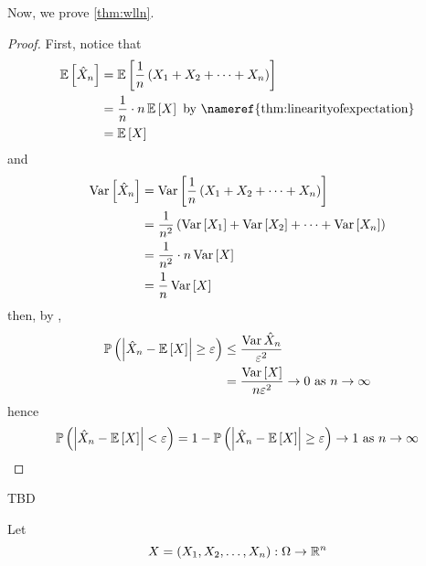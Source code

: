 Now, we prove \cref{thm:wlln}.

\begin{proof}
    First, notice that
    \begin{align*}\expectation{\sampleavg{X}_n}
         & = \expectation{\frac{1}{n}\left(X_1 + X_2 + \dots + X_n\right)}                     \\
         & = \frac{1}{n} \cdot n\expectation{X}\hbox{ by \nameref{thm:linearityofexpectation}} \\
         & = \expectation{X}
    \end{align*}
    and
    \begin{align*}\operatorname{\operatorname{Var}}\left[\hat{X}_n\right]
         & = \operatorname{\operatorname{Var}}\left[\frac{1}{n}\left(X_1 + X_2 + \dots + X_n\right)\right]                         \\
         & = \frac{1}{n^2}\left(\operatorname{\operatorname{Var}}\left[X_1\right] + \operatorname{\operatorname{Var}}\left[X_2\right] + \dots + \operatorname{\operatorname{Var}}\left[X_n\right]\right) \\
         & = \frac{1}{n^2} \cdot n \operatorname{\operatorname{Var}}\left[X\right]                                                 \\
         & = \frac{1}{n}\operatorname{\operatorname{Var}}\left[X\right]
    \end{align*}
    then, by ,
    \begin{align*}\prob{\abs{\sampleavg{X}_n - \expectation{X}} \geq \varepsilon}
         & \leq \frac{\var{\sampleavg{X}_n}}{\varepsilon^2}                                 \\
         & = \frac{\variance{X}}{n\varepsilon^2}            \to 0 \hbox{ as $n \to \infty$}
    \end{align*}
    hence
    \[\prob{\abs{\sampleavg{X}_n - \expectation{X}} < \varepsilon} = 1 - \prob{\abs{\sampleavg{X}_n - \expectation{X}} \geq \varepsilon} \to 1 \hbox{ as $n \to \infty$}\qedhere\]
\end{proof}

\begin{example}
    TBD
\end{example}

\begin{definition}
    Let
    \[X = (X_1, X_2, \dots, X_n): \Omega \to \mathbb{R}^n\]
\end{definition}